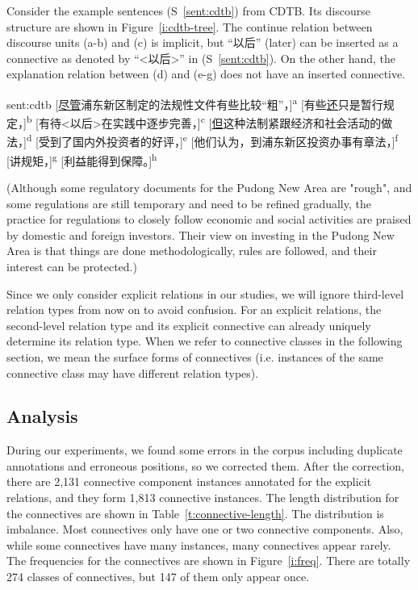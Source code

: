 Consider the example sentences (S~\ref{sent:cdtb}) from CDTB. Its discourse
structure are shown in Figure~\ref{i:cdtb-tree}. The continue relation between
discourse units (a-b) and (c) is implicit, but ``以后'' (later) can be inserted
as a connective as denoted by ``<以后>'' in (S~\ref{sent:cdtb}).
On the other hand, the explanation relation between (d) and (e-g)
does not have an inserted connective.


\begin{sent}{sent:cdtb}{}
    [\underline{尽管}浦东新区制定的法规性文件有些比较``粗''，]\textsuperscript{a}
    [有些\underline{还}只是暂行规定，]\textsuperscript{b}
    [有待<以后>在实践中逐步完善，]\textsuperscript{c}
    [\underline{但}这种法制紧跟经济和社会活动的做法，]\textsuperscript{d}
    [受到了国内外投资者的好评，]\textsuperscript{e}
    [他们认为，到浦东新区投资办事有章法，]\textsuperscript{f}
    [讲规矩，]\textsuperscript{g}
    [利益能得到保障。]\textsuperscript{h}

    (Although some regulatory documents for the Pudong New Area are "rough",
    and some regulations are still temporary and
    need to be refined gradually,
    the practice for regulations to closely follow economic and social activities
    are praised by domestic and foreign investors.
    Their view on investing in the Pudong New Area is that
    things are done methodologically,
    rules are followed,
    and their interest can be protected.)
\end{sent}



Since we only consider explicit relations in our studies, we will ignore
third-level relation types from now on to avoid confusion.
For an explicit relations, the second-level relation type and its explicit
connective can already uniquely determine its relation type.
When we refer to connective classes in the following section, we mean the
surface forms of connectives (i.e. instances of the same connective class
may have different relation types).

\subsection{Analysis}

During our experiments, we found some errors in the corpus including
duplicate annotations and erroneous positions, so we corrected
them. After the correction, there are 2,131 connective component instances
annotated for the explicit relations, and they form 1,813 connective instances.
The length distribution for the connectives are shown in Table~\ref{t:connective-length}.
The distribution is imbalance. Most connectives only have
one or two connective components. Also, while some connectives have many instances,
many connectives appear rarely. The frequencies for the connectives are shown
in Figure~\ref{i:freq}. There are totally 274 classes of connectives, but
147 of them only appear once.


